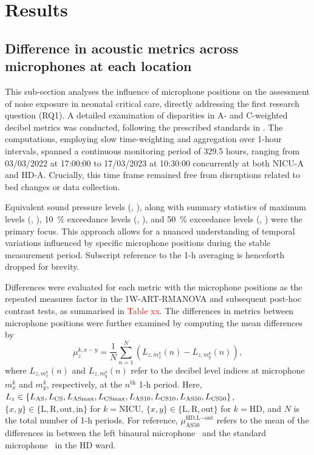 \section{Results}
\label{sec:results}

\subsection{Difference in acoustic metrics across microphones at each location}

This sub-section analyses the influence of microphone positions on the assessment of noise exposure in neonatal critical care, directly addressing the first research question (RQ1). A detailed examination of disparities in A- and C-weighted decibel metrics was conducted, following the prescribed standards in . The computations, employing slow time-weighting and aggregation over 1-hour intervals, spanned a continuous monitoring period of 329.5 hours, ranging from 03/03/2022 at 17:00:00 to 17/03/2023 at 10:30:00 concurrently at both NICU-A and HD-A. Crucially, this time frame remained free from disruptions related to bed changes or data collection.

Equivalent sound pressure levels (, ), along with summary statistics of maximum levels (, ), \SI{10}{\percent} exceedance levels (, ), and \SI{50}{\percent} exceedance levels (, ) were the primary focus. This approach allows for a nuanced understanding of temporal variations influenced by specific microphone positions during the stable measurement period. Subscript reference to the 1-\si{\hour} averaging is henceforth dropped for brevity. 

Differences were evaluated for each metric with the microphone positions as the repeated measures factor in the 1W-ART-RMANOVA and subsequent post-hoc contrast tests, as summarised in \textcolor{red}{Table xx}. The differences in metrics between microphone positions were further examined by computing the mean differences by
\begin{equation}
    \mu^{k,x-y}_{z}=\frac{1}{N}\sum^{N}_{n=1}(L_{z,m_x^k}(n) - L_{z,m_y^k}(n)),   
\end{equation}
where $L_{z,m_x^k}(n)$ and $L_{z,m_y^k}(n)$ refer to the decibel level indices at microphone $m_x^k$ and $m_y^k$, respectively, at the $n^\text{th}$ 1-\si{\hour} period. Here, $L_z \in \{L_\text{AS}, L_\text{CS}, L_\text{ASmax}, L_\text{CSmax}, L_\text{AS10}, L_\text{CS10}, L_\text{AS50}, \\L_\text{CS50}\}$, $\{x,y\}\in\{\text{L},\text{R},\text{out},\text{in}\}$ for $k=\text{NICU}$, $\{x,y\}\in\{\text{L},\text{R},\text{out}\}$ for $k=\text{HD}$, and $N$ is the total number of 1-\si{\hour} periods. For reference, $\mu^{{\text{HD,L}-\text{out}}}_{\text{AS50}}$ refers to the mean of the differences in  between the left binaural microphone \HDbinL\ and the standard microphone \HDGRAS\ in the HD ward.

